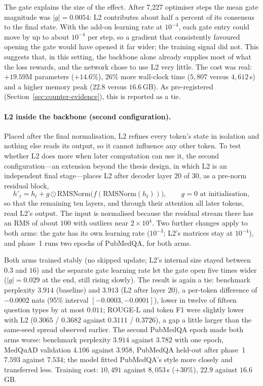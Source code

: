 \documentclass[11pt,a4paper]{article}
\theoremstyle{plain}
\theoremstyle{definition}
\theoremstyle{remark}
\begin{document}
\noindent
The gate explains the size of the effect. After 7{,}227 optimiser steps the
mean gate magnitude was $|g| = 0.0054$: L2 contributes about half a percent
of its consensus to the final state. With the add-on learning rate at
$10^{-4}$, each gate entry could move by up to about $10^{-4}$ per step, so a
gradient that consistently favoured opening the gate would have opened it far
wider; the training signal did not. This suggests that, in this setting,
the backbone alone already supplies most of what the loss rewards, and the
network chose to use L2 very little. The cost was real: $+19.59$M parameters ($+14.6\%$), $26\%$ more
wall-clock time ($5{,}807$ versus $4{,}612$\,s) and a higher memory peak
($22.8$ versus $16.6$\,GB). As pre-registered (Section~\ref{sec:counter-evidence}),
this is reported as a tie.

\noindent
\paragraph{L2 inside the backbone (second configuration).}
Placed after the final normalisation, L2 refines every token's state in
isolation and nothing else reads its output, so it cannot influence any other
token. To test whether L2 does more when later computation can use it, the
second configuration---an extension beyond the thesis design, in which L2 is
an independent final stage---places L2 after decoder layer 20 of 30, as a
pre-norm residual block,
\begin{equation}
  h'_t = h_t + g \odot \mathrm{RMSNorm}\bigl(f(\mathrm{RMSNorm}(h_t))\bigr),
  \qquad g = 0 \text{ at initialisation},
  \label{eq:mid-addon}
\end{equation}
so that the remaining ten layers, and through their attention all later
tokens, read L2's output. The input is normalised because the residual
stream there has an RMS of about $100$ with outliers near $2\times10^{4}$.
Two further changes apply to both arms: the gate has its own learning rate
($10^{-3}$; L2's matrices stay at $10^{-4}$), and phase~1 runs two epochs of
PubMedQA, for both arms.

\noindent
Both arms trained stably (no skipped update; L2's internal size stayed
between $0.3$ and $16$) and the separate gate learning rate let the gate open
five times wider ($|g| = 0.029$ at the end, still rising slowly). The result
is again a tie: benchmark perplexity $3.914$ (baseline) and $3.913$ (L2 after
layer 20), a per-token difference of $-0.0002$ nats (95\% interval
$[-0.0003, -0.0001]$), lower in twelve of fifteen question types by at most
$0.011$; ROUGE-L and token F1 were slightly lower with L2 ($0.3065$ / $0.3682$
against $0.3111$ / $0.3726$), a gap a little larger than the same-seed spread
observed earlier. The second PubMedQA epoch made both arms worse: benchmark
perplexity $3.914$ against $3.782$ with one epoch, MedQuAD validation $4.106$
against $3.958$, PubMedQA held-out after phase~1 $7.593$ against $7.534$; the
model fitted PubMedQA's style more closely and transferred less. Training
cost: $10{,}491$ against $8{,}053$\,s ($+30\%$), $22.9$ against $16.6$\,GB.
\end{document}
